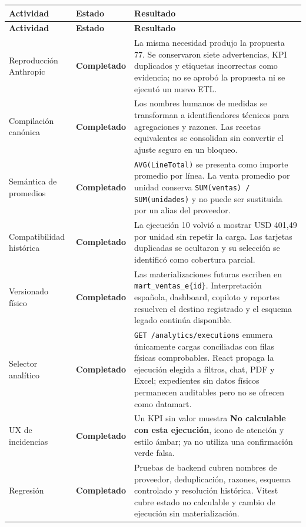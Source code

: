 \documentclass[11pt,letterpaper]{article}
\newcommand{\statusok}{\textcolor{deepgreen}{\textbf{Completado}}}
\newcommand{\file}[1]{\texttt{#1}}
\begin{document}
\begin{longtable}{@{}p{}p{}p{}@{}}
  \toprule
  \textbf{Actividad} & \textbf{Estado} & \textbf{Resultado} \\
  \midrule
  \endfirsthead
  \toprule
  \textbf{Actividad} & \textbf{Estado} & \textbf{Resultado} \\
  \midrule
  \endhead
  Reproducción Anthropic & \statusok & La misma necesidad produjo la propuesta 77. Se conservaron siete advertencias, KPI duplicados y etiquetas incorrectas como evidencia; no se aprobó la propuesta ni se ejecutó un nuevo ETL. \\
  Compilación canónica & \statusok & Los nombres humanos de medidas se transforman a identificadores técnicos para agregaciones y razones. Las recetas equivalentes se consolidan sin convertir el ajuste seguro en un bloqueo. \\
  Semántica de promedios & \statusok & \file{AVG(LineTotal)} se presenta como importe promedio por línea. La venta promedio por unidad conserva \file{SUM(ventas) / SUM(unidades)} y no puede ser sustituida por un alias del proveedor. \\
  Compatibilidad histórica & \statusok & La ejecución 10 volvió a mostrar USD 401,49 por unidad sin repetir la carga. Las tarjetas duplicadas se ocultaron y su selección se identificó como cobertura parcial. \\
  Versionado físico & \statusok & Las materializaciones futuras escriben en \file{mart\_ventas\_e\{id\}}. Interpretación española, dashboard, copiloto y reportes resuelven el destino registrado y el esquema legado continúa disponible. \\
  Selector analítico & \statusok & \file{GET /analytics/executions} enumera únicamente cargas conciliadas con filas físicas comprobables. React propaga la ejecución elegida a filtros, chat, PDF y Excel; expedientes sin datos físicos permanecen auditables pero no se ofrecen como datamart. \\
  UX de incidencias & \statusok & Un KPI sin valor muestra \textbf{No calculable con esta ejecución}, icono de atención y estilo ámbar; ya no utiliza una confirmación verde falsa. \\
  Regresión & \statusok & Pruebas de backend cubren nombres de proveedor, deduplicación, razones, esquema controlado y resolución histórica. Vitest cubre estado no calculable y cambio de ejecución sin materialización. \\
  \bottomrule
\end{longtable}
\end{document}
